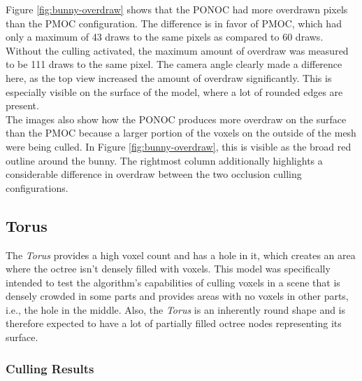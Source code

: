 \noindent
Figure \ref{fig:bunny-overdraw} shows that the \ac{PONOC} had more overdrawn pixels than the 
\ac{PMOC} configuration. The difference is in favor of \ac{PMOC}, which had only a maximum of 
43 draws to the same pixels as compared to 60 draws. Without the culling activated, the maximum 
amount of overdraw was measured to be 111 draws to the same pixel. The camera angle clearly made 
a difference here, as the top view increased the amount of overdraw significantly. This is 
especially visible on the surface of the model, where a lot of rounded edges are present. \\

\noindent
The images also show how the \ac{PONOC} produces more overdraw on the surface than the \ac{PMOC} 
because a larger portion of the voxels on the outside of the mesh were being culled. In Figure 
\ref{fig:bunny-overdraw}, this is visible as the broad red outline around the bunny. The rightmost 
column additionally highlights a considerable difference in overdraw between the two occlusion 
culling configurations.

\clearpage



\subsection*{Torus}

The \emph{Torus} provides a high voxel count and has a hole in it, which creates an area where the 
octree isn't densely filled with voxels. This model was specifically intended to test the algorithm's 
capabilities of culling voxels in a scene that is densely crowded in some parts and provides areas with 
no voxels in other parts, i.e., the hole in the middle. Also, the \emph{Torus} is an inherently round 
shape and is therefore expected to have a lot of partially filled octree nodes representing its surface. 

\subsubsection*{Culling Results} \label{subsubsec-culling-results-torus}


